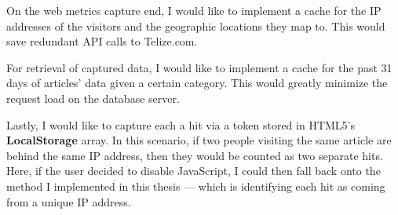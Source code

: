 \documentclass[12pt]{article}
\begin{document}
{On the web metrics capture end, I would like to implement a cache for the IP addresses of the visitors and the geographic locations they map to. This would save redundant API calls to Telize.com. 

For retrieval of captured data, I would like to implement a cache for the past 31 days of articles' data given a certain category. This would greatly minimize the request load on the database server.

Lastly, I would like to capture each a hit via a token stored in HTML5's \textbf{LocalStorage} array. In this scenario, if two people visiting the same article are behind the same IP address, then they would be counted as two separate hits. Here, if the user decided to disable JavaScript, I could then fall back onto the method I implemented in this thesis --- which is identifying each hit as coming from a unique IP address.

\newpage

}
\end{document}
